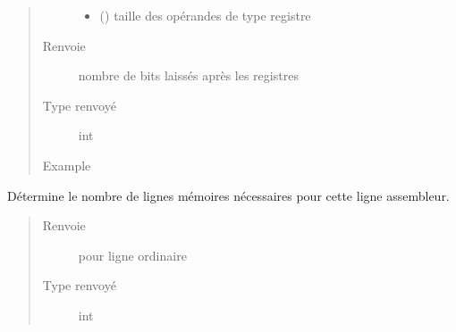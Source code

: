 \documentclass[letterpaper,10pt,french]{sphinxmanual}
\begin{document}
\begin{fulllineitems}
\begin{fulllineitems}
\begin{quote}
\begin{description}
\begin{itemize}
\item {} 
 () \textendash{} taille des opérandes de type registre

\end{itemize}

\item[{Renvoie}] \leavevmode
nombre de bits laissés après les registres

\item[{Type renvoyé}] \leavevmode
int

\item[{Example}] \leavevmode
\begin{sphinxVerbatim}[commandchars=\\\{\}]
    
\end{sphinxVerbatim}

\end{description}\end{quote}

\end{fulllineitems}


\begin{fulllineitems}
\label{\detokenize{assembleurlines:assembleurlines.AsmLine.getSizeInMemory}}
Détermine  le nombre de lignes mémoires nécessaires pour cette ligne assembleur.
\begin{quote}\begin{description}
\item[{Renvoie}]  pour ligne ordinaire

\item[{Type renvoyé}] \leavevmode
int


\end{description}
\end{quote}
\end{fulllineitems}
\end{fulllineitems}
\end{document}
